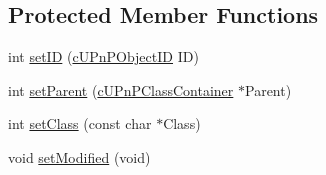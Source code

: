 \subsection*{Protected Member Functions}
\begin{CompactItemize}
\item 
int \hyperlink{classcUPnPClassObject_1e00f20de14c17cfebd4f6670d5e548d}{setID} (\hyperlink{structcUPnPObjectID}{cUPnPObjectID} ID)
\item 
int \hyperlink{classcUPnPClassObject_d092a68523a7e3a8bd8d1b6f79888eff}{setParent} (\hyperlink{classcUPnPClassContainer}{cUPnPClassContainer} $\ast$Parent)
\item 
int \hyperlink{classcUPnPClassObject_980233a73fe6b3286313f992909602ae}{setClass} (const char $\ast$Class)
\item 
void \hyperlink{classcUPnPClassObject_f5c5ca8dd663fe6c59ee2d29dba870e5}{setModified} (void)
\end{CompactItemize}
